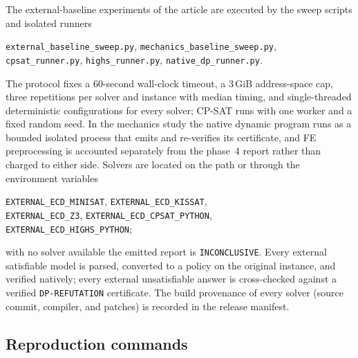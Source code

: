 The external-baseline experiments of the article are executed by the sweep
scripts and isolated runners
\begin{center}
\footnotesize
\texttt{external\_baseline\_sweep.py}, \texttt{mechanics\_baseline\_sweep.py},\\
\texttt{cpsat\_runner.py}, \texttt{highs\_runner.py},
\texttt{native\_dp\_runner.py}.
\end{center}
\noindent The protocol fixes a 60-second wall-clock timeout, a 3\,GiB
address-space cap, three repetitions per solver and instance with median
timing, and single-threaded deterministic configurations for every solver;
CP-SAT runs with one worker and a fixed random seed. In the mechanics study
the native dynamic program runs as a bounded isolated process that emits and
re-verifies its certificate, and FE preprocessing is accounted separately
from the phase~4 report rather than charged to either side. Solvers are located on the path or through the
environment variables
\begin{center}
\footnotesize
\texttt{EXTERNAL\_ECD\_MINISAT}, \texttt{EXTERNAL\_ECD\_KISSAT},\\
\texttt{EXTERNAL\_ECD\_Z3}, \texttt{EXTERNAL\_ECD\_CPSAT\_PYTHON},\\
\texttt{EXTERNAL\_ECD\_HIGHS\_PYTHON};
\end{center}
with no solver available the emitted report is \texttt{INCONCLUSIVE}. Every
external satisfiable model is parsed, converted to a policy on the original
instance, and verified natively; every external unsatisfiable answer is
cross-checked against a verified \texttt{DP-REFUTATION} certificate. The build
provenance of every solver (source commit, compiler, and patches) is recorded
in the release manifest.

\subsection{Reproduction commands}

